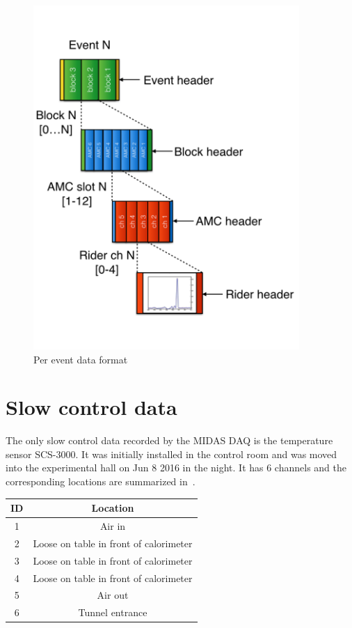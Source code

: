\begin{figure}[htbp]
\centering
\includegraphics[width=0.9\textwidth]{pics/AllHeaders}
\caption{Per event data format}
\end{figure}

\section{Slow control data}

The only slow control data recorded by the MIDAS DAQ is the temperature sensor SCS-3000. It was initially installed in the control room and was moved into the experimental hall on Jun 8 2016 in the night. It has 6 channels and the corresponding locations are summarized in~.

\begin{table}[htbp]
\caption{Locations of the temperature sensors of SCS-3000.}
\begin{longtable}{|c|c|} \hline
ID &  Location \\ \hline
1 & Air in \\ \hline
2 & Loose on table in front of calorimeter \\ \hline
3 & Loose on table in front of calorimeter \\ \hline
4 & Loose on table in front of calorimeter \\ \hline
5 & Air out \\ \hline
6 & Tunnel entrance \\ \hline
\end{longtable}
\label{tab:temp}
\end{table}
